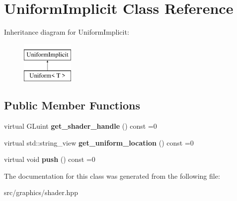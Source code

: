 \hypertarget{class_uniform_implicit}{}\section{Uniform\+Implicit Class Reference}
\label{class_uniform_implicit}
Inheritance diagram for Uniform\+Implicit\+:\begin{figure}[H]
\begin{center}
\leavevmode
\includegraphics[height=2.000000cm]{class_uniform_implicit}
\end{center}
\end{figure}
\subsection*{Public Member Functions}
\begin{DoxyCompactItemize}
\item 
\mbox{\label{class_uniform_implicit_aee430c236fdcb8fffb52e42f8d693e94}} 
virtual G\+Luint {\bfseries get\+\_\+shader\+\_\+handle} () const =0
\item 
\mbox{\label{class_uniform_implicit_afe64ca7076103269633a6e0ffbf1a63d}} 
virtual std\+::string\+\_\+view {\bfseries get\+\_\+uniform\+\_\+location} () const =0
\item 
\mbox{\label{class_uniform_implicit_ab417a55fb98b7b919f89dc549561475e}} 
virtual void {\bfseries push} () const =0
\end{DoxyCompactItemize}


The documentation for this class was generated from the following file\+:\begin{DoxyCompactItemize}
\item 
src/graphics/shader.\+hpp\end{DoxyCompactItemize}
